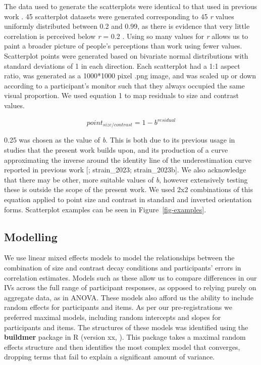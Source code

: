 \documentclass[manuscript, review, anonymous, screen]{acmart}
\begin{document}
The data used to generate the scatterplots were identical to that used
in previous work \citep{strain_2023, strain_2023b}. 45 scatterplot
datasets were generated corresponding to 45 \emph{r} values uniformly
distributed between 0.2 and 0.99, as there is evidence that very little
correlation is perceived below \emph{r} = 0.2
\citep{strahan_1978, bobko_1979, cleveland_1982}. Using so many values
for \emph{r} allows us to paint a broader picture of people's
perceptions than work using fewer values. Scatterplot points were
generated based on bivariate normal distributions with standard
deviations of 1 in each direction. Each scatterplot had a 1:1 aspect
ratio, was generated as a 1000*1000 pixel .png image, and was scaled up
or down according to a participant's monitor such that they always
occupied the same visual proportion. We used equation 1 to map residuals
to size and contrast values.

\begin{equation}
  point_{size/contrast} = 1 - b^{residual}
\end{equation}

0.25 was chosen as the value of \emph{b}. This is both due to its
previous usage in studies that the present work builds upon, and its
production of a curve approximating the inverse around the identity line
of the underestimation curve reported in previous work
{[}\citet{rensink_2017}; strain\_2023; strain\_2023b{]}. We also
acknowledge that there may be other, more suitable values of \emph{b},
however extensively testing these is outside the scope of the present
work. We used 2x2 combinations of this equation applied to point size
and contrast in standard and inverted orientation forms. Scatterplot
examples can be seen in Figure~\ref{fig-examples}.

\hypertarget{sec-gen-modelling}{%
\subsection{Modelling}\label{sec-gen-modelling}}

We use linear mixed effects models to model the relationships between
the combination of size and contrast decay conditions and participants'
errors in correlation estimates. Models such as these allow us to
compare differences in our IVs across the full range of participant
responses, as opposed to relying purely on aggregate data, as in ANOVA.
These models also afford us the ability to include random effects for
participants and items. As per our pre-registrations we preferred
maximal models, including random intercepts and slopes for participants
and items. The structures of these models was identified using the
\textbf{buildmer} package in R (version xx, \citep{voeten_buildmer}).
This package takes a maximal random effects structure and then
identifies the most complex model that converges, dropping terms that
fail to explain a significant amount of variance.
\end{document}
